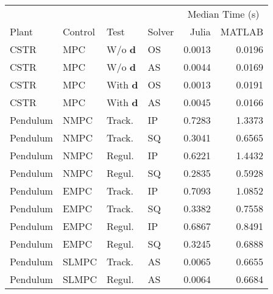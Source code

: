 \begin{tabular}{llllrr}
	
\toprule %

	  &	& & & \multicolumn{2}{c}{Median Time (s)} \\ \cmidrule(l){5-6}
Plant & Control & Test & Solver & Julia & MATLAB \\
\midrule %

CSTR		& MPC	& W/o $\mathbf{d}$	& OS & \num{0.0013} & \num{0.0196}	\\
CSTR		& MPC	& W/o $\mathbf{d}$	& AS & \num{0.0044} & \num{0.0169}	\\
CSTR		& MPC	& With $\mathbf{d}$ & OS & \num{0.0013} & \num{0.0191}	\\
CSTR		& MPC	& With $\mathbf{d}$ & AS & \num{0.0045} & \num{0.0166}	\\
Pendulum 	& NMPC	& Track. 	   		& IP & \num{0.7283} & \num{1.3373}	\\
Pendulum 	& NMPC	& Track. 	   		& SQ & \num{0.3041} & \num{0.6565}	\\
Pendulum    & NMPC	& Regul. 			& IP & \num{0.6221} & \num{1.4432} 	\\
Pendulum    & NMPC	& Regul. 			& SQ & \num{0.2835} & \num{0.5928} 	\\
Pendulum    & EMPC	& Track.			& IP & \num{0.7093} & \num{1.0852} 	\\
Pendulum    & EMPC	& Track.			& SQ & \num{0.3382} & \num{0.7558} 	\\
Pendulum	& EMPC	& Regul. 			& IP & \num{0.6867} & \num{0.8491} 	\\
Pendulum	& EMPC	& Regul. 			& SQ & \num{0.3245} & \num{0.6888}  \\
Pendulum    & SLMPC & Track.			& AS & \num{0.0065} & \num{0.6655}  \\
Pendulum    & SLMPC & Regul.			& AS & \num{0.0064} & \num{0.6684}  \\
	
\bottomrule %
	
\end{tabular}
